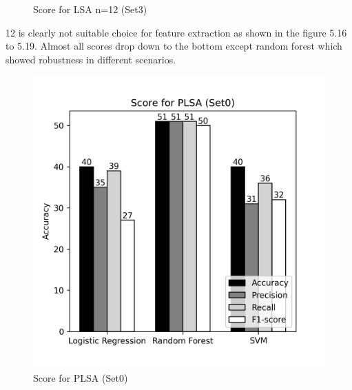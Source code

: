 \documentclass[12pt]{report}
\begin{document}
\begin{figure}[!htb]
\begin{minipage}{0.48\textwidth}
                  \caption{Score for LSA n=12 (Set3)}\label{Fig:typo2}
                \end{minipage}
             \end{figure}
 
            12 is clearly not suitable choice for feature extraction as shown in the figure 5.16 to 5.19. Almost all scores drop down to the bottom except random forest which 
            showed robustness in different scenarios. 


             \begin{figure}[!htb]
                \begin{minipage}{0.48\textwidth}
                  \centering
                  \includegraphics[scale=0.55]{plots/Score for PLSA (Set0).png}
                  \caption{Score for PLSA (Set0)}\label{Fig:typo1}
                \end{minipage}\hfill
                \begin{minipage}{0.48\textwidth}
                  \centering

\end{minipage}
\end{figure}
\end{document}
